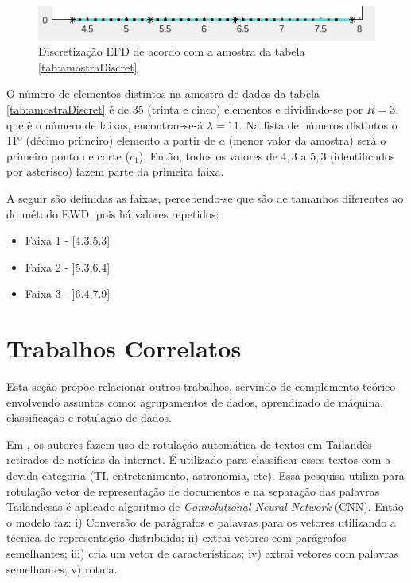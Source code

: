\begin{figure}[h] 
        \centering
        \includegraphics[scale=0.9]{figs/efd_fisheriris_col1.png}
        \caption{Discretização EFD de acordo com a amostra da tabela \ref{tab:amostraDiscret}}%
        \label{fig:faixasFihseririsExemploEFD}
\end{figure}

O número de elementos distintos na amostra de dados da tabela \ref{tab:amostraDiscret} é de 35 (trinta e cinco) elementos e dividindo-se por ${R=3}$, que é o número de faixas, encontrar-se-á ${\lambda=11}$. Na lista de números distintos o 11º (décimo primeiro) elemento a partir de ${a}$ (menor valor da amostra) será o primeiro ponto de corte (${c_1}$). Então, todos os valores de ${4,3}$ a ${5,3}$ (identificados por asterisco) fazem parte da primeira faixa.

A seguir são definidas as faixas, percebendo-se que são de tamanhos diferentes ao do método EWD, pois há valores repetidos:

\vspace{-3mm}
\begin{itemize}[noitemsep]
 \item Faixa 1 - [4.3,5.3]
 \item Faixa 2 - ]5.3,6.4]
 \item Faixa 3 - ]6.4,7.9]

\end{itemize}


 

\section{Trabalhos Correlatos}\label{cap:refTeor:sec:trabcorrel}

Esta seção propõe relacionar outros trabalhos, servindo de complemento teórico envolvendo assuntos como: agrupamentos de dados, aprendizado de máquina, classificação e rotulação de dados. 

Em \cite{Jirasirilerd2018}, os autores fazem uso de rotulação automática de textos em Tailandês retirados de notícias da internet. É utilizado para classificar esses textos com a devida categoria (TI, entretenimento, astronomia, etc). Essa pesquisa utiliza para rotulação vetor de representação de documentos e na separação das palavras Tailandesas é aplicado algoritmo de \textit{Convolutional Neural Network} (CNN). Então o modelo faz: i) Conversão de parágrafos e palavras para os vetores utilizando a técnica de representação distribuída; ii) extrai vetores com parágrafos semelhantes; iii) cria um vetor de características; iv) extrai vetores com palavras semelhantes; v) rotula.



